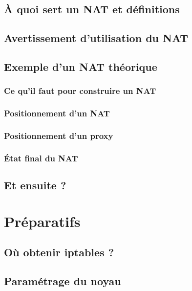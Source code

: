 \documentclass[a4paper,11pt]{report}
\begin{document}
\section{À quoi sert un NAT et définitions}

\section{Avertissement d'utilisation du NAT}

\section{Exemple d'un NAT théorique}

\subsection{Ce qu'il faut pour construire un NAT}

\subsection{Positionnement d'un NAT}

\subsection{Positionnement d'un proxy}

\subsection{État final du NAT}

%
\section{Et ensuite ?}

\chapter{Préparatifs}

\section{Où obtenir iptables ?}

\section{Paramétrage du noyau}
\end{document}
